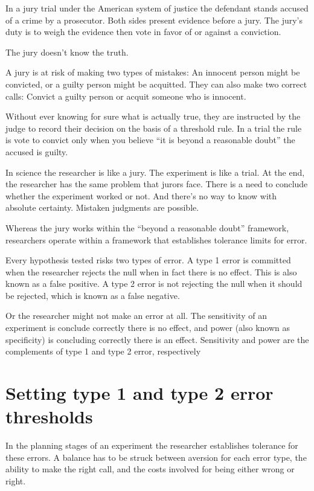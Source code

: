 \documentclass[]{book}
\begin{document}
In a jury trial under the American system of justice the defendant stands accused of a crime by a prosecutor. Both sides present evidence before a jury. The jury's duty is to weigh the evidence then vote in favor of or against a conviction.

The jury doesn't know the truth.

A jury is at risk of making two types of mistakes: An innocent person might be convicted, or a guilty person might be acquitted. They can also make two correct calls: Convict a guilty person or acquit someone who is innocent.

Without ever knowing for sure what is actually true, they are instructed by the judge to record their decision on the basis of a threshold rule. In a trial the rule is vote to convict only when you believe ``it is beyond a reasonable doubt'' the accused is guilty.

In science the researcher is like a jury. The experiment is like a trial. At the end, the researcher has the same problem that jurors face. There is a need to conclude whether the experiment worked or not. And there's no way to know with absolute certainty. Mistaken judgments are possible.

Whereas the jury works within the ``beyond a reasonable doubt'' framework, researchers operate within a framework that establishes tolerance limits for error.

Every hypothesis tested risks two types of error. A type 1 error is committed when the researcher rejects the null when in fact there is no effect. This is also known as a false positive. A type 2 error is not rejecting the null when it should be rejected, which is known as a false negative.

Or the researcher might not make an error at all. The sensitivity of an experiment is conclude correctly there is no effect, and power (also known as specificity) is concluding correctly there is an effect. Sensitivity and power are the complements of type 1 and type 2 error, respectively

\hypertarget{setting-type-1-and-type-2-error-thresholds}{%
\section{Setting type 1 and type 2 error thresholds}\label{setting-type-1-and-type-2-error-thresholds}}

In the planning stages of an experiment the researcher establishes tolerance for these errors. A balance has to be struck between aversion for each error type, the ability to make the right call, and the costs involved for being either wrong or right.
\end{document}
